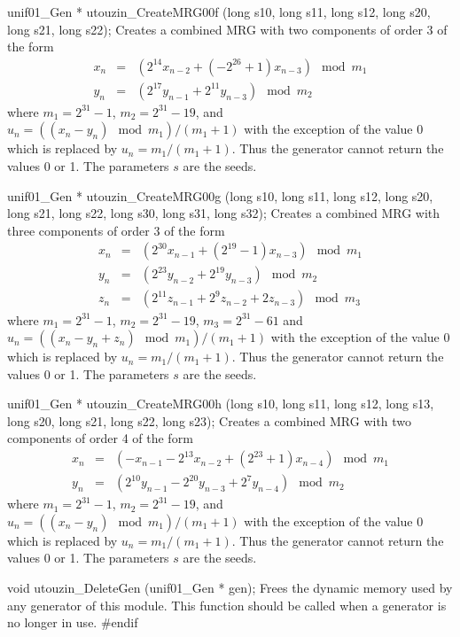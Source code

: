 unif01_Gen * utouzin_CreateMRG00f (long s10, long s11, long s12,
                                   long s20, long s21, long s22);
\endcode
  \tab Creates a combined MRG with two components of order 3 of the form
\begin{eqnarray*}
x_n &=& \left(2^{14}x_{n-2}  + (-2^{26} + 1)x_{n-3}\right) \mod m_1 \\
y_n &=& \left(2^{17}y_{n-1}  + 2^{11}y_{n-3}\right) \mod m_2
\end{eqnarray*}
where $m_1 = 2^{31} - 1$, $m_2 = 2^{31} - 19$,  and $u_n =
 \left((x_n - y_n)\mod m_1 \right)/(m_1+1)$ with the exception of the value
0 which is replaced by $u_n = m_1 /(m_1+1)$. Thus the generator cannot return
the values 0 or 1.
 The parameters $s$ are the seeds.
 \endtab
\code


unif01_Gen * utouzin_CreateMRG00g (long s10, long s11, long s12,
                                   long s20, long s21, long s22,
                                   long s30, long s31, long s32);
\endcode
  \tab Creates a combined MRG with three components of order 3 of the form
\begin{eqnarray*}
x_n &=& \left(2^{30} x_{n-1} + (2^{19} - 1) x_{n-3}\right) \mod m_1 \\
y_n &=& \left(2^{23} y_{n-2} + 2^{19} y_{n-3}\right) \mod m_2 \\
z_n &=& \left(2^{11} z_{n-1} + 2^{9} z_{n-2} + 2 z_{n-3}\right) \mod m_3
\end{eqnarray*}
where $m_1 = 2^{31} - 1$, $m_2 = 2^{31} - 19$,  $m_3 = 2^{31} - 61$
 and $u_n = \left((x_n - y_n + z_n)\mod m_1 \right)/(m_1+1)$ with the
 exception of the value 0 which is replaced by $u_n = m_1 /(m_1+1)$.
Thus the generator cannot return the values 0 or 1.
 The parameters $s$ are the seeds.
 \endtab
\code


unif01_Gen * utouzin_CreateMRG00h (long s10, long s11, long s12, long s13,
                                   long s20, long s21, long s22, long s23);
\endcode
  \tab Creates a combined MRG with two components of order 4 of the form
\begin{eqnarray*}
x_n &=& \left(-x_{n-1} - 2^{13}x_{n-2} + (2^{23} + 1)x_{n-4}\right) \mod m_1 \\
y_n &=& \left(2^{10}y_{n-1}  - 2^{20}y_{n-3} + 2^{7}y_{n-4}\right) \mod m_2
\end{eqnarray*}
where $m_1 = 2^{31} - 1$, $m_2 = 2^{31} - 19$,  and $u_n =
 \left((x_n - y_n)\mod m_1 \right)/(m_1+1)$ with the exception of the value
0 which is replaced by $u_n = m_1 /(m_1+1)$. Thus the generator cannot return
the values 0 or 1.%
 The parameters $s$ are the seeds.
 \endtab



\code


void utouzin_DeleteGen (unif01_Gen * gen);
\endcode
  \tab Frees the dynamic memory used by any generator of this module.
  This function should be called when a generator
  is no longer in use.
 \endtab
\code\hide
#endif
\endhide
\endcode
